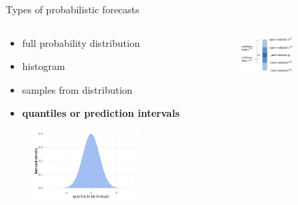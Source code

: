 \documentclass[en]{sdqbeamer}
\begin{document}
\begin{frame}[t]{Types of probabilistic forecasts}

\begin{columns}
\begin{column}{0.39\textwidth}
    \begin{itemize}
\item full probability distribution
\item histogram
\item samples from distribution
\item \textbf{quantiles or prediction intervals}
\end{itemize}
\begin{figure}
        \centering
        \includegraphics[width=0.8\textwidth]{figures_svr/densityfc.pdf} 
        \label{fig:enter-label}
    \end{figure}
\end{column}
\begin{column}{0.52\textwidth}
\vspace*{-1.55cm}
    \begin{figure}
        \centering
        \includegraphics[width=0.7\textwidth]{figures_svr/CI_illustration.pdf} 
        \label{fig:enter-label}
    \end{figure}     
\end{column}
\begin{column}{0.01\textwidth}

\end{column}
\end{columns}
\end{frame}
\end{document}
